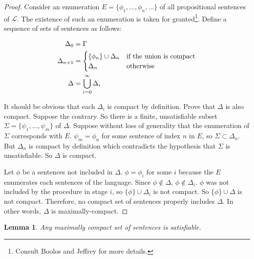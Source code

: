 \documentclass[12pt]{article}
\newtheorem{lemma}[theorem]{Lemma}
\theoremstyle{definition}
\theoremstyle{remark}
\begin{document}
\begin{proof}
	Consider an enumeration $E = \{ \phi_1, ..., \phi_n, ... \}$ of all propositional sentences of $\mathscr{L}$. The existence of such an enumeration is taken for granted\footnote{Consult Boolos and Jeffrey\cite{boolosjeffrey} for more details.}. Define a sequence of sets of sentences as follows:
	
	\begin{align*}
	\Delta_0 &= \Gamma \\
	\Delta_{n+1} &= \begin{cases}
	\{ \phi_n \} \cup \Delta_n & \textnormal{if the union is compact} \\
	\Delta_n & \textnormal{otherwise}
	\end{cases}\\
	\Delta &= \bigcup_{i=0}^\infty \Delta_i
	\end{align*}
	
	It should be obvious that each $\Delta_i$ is compact by definition. Prove that $\Delta$ is also compact. Suppose the contrary. So there is a finite, unsatisfiable subset $\Sigma = \{ \psi_1, ..., \psi_m \}$ of $\Delta$. Suppose without loss of generality that the enumeration of $\Sigma$ corresponds with $E$. $\psi_m = \phi_n$ for some sentence of index $n$ in $E$, so $\Sigma\subset\Delta_n$. But $\Delta_n$ is compact by definition which contradicts the hypothesis that $\Sigma$ is unsatisfiable. So $\Delta$ is compact.
	
	Let $\phi$ be a sentences not included in $\Delta$. $\phi=\phi_i$ for some $i$ because the $E$ enumerates each sentences of the language. Since $\phi \not\in \Delta$, $\phi \not\in \Delta_i$. $\phi$ was not included by the procedure in stage $i$, so $\{ \phi \} \cup \Delta_i$ is not compact. So $\{ \phi \} \cup \Delta$ is not compact. Therefore, no compact set of sentences properly includes $\Delta$. In other words, $\Delta$ is maximally-compact.
\end{proof}

\begin{lemma}
	\label{lem:prop-sat}
	Any maximally compact set of sentences is satisfiable.
\end{lemma}
\end{document}

